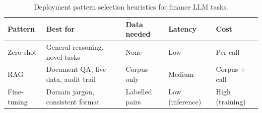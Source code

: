 \begin{table}[ht]
\centering
\caption{Deployment pattern selection heuristics for finance LLM tasks.}
\label{tab:deployment-heuristics}
\small
\begin{tabularx}{\linewidth}{l X X l X}
\hline
\textbf{Pattern} & \textbf{Best for} & \textbf{Data needed} & \textbf{Latency} & \textbf{Cost} \\
\hline
Zero-shot & General reasoning, novel tasks & None & Low & Per-call \\
RAG & Document QA, live data, audit trail & Corpus only & Medium & Corpus + call \\
Fine-tuning & Domain jargon, consistent format & Labelled pairs & Low (inference) & High (training) \\
\hline
\end{tabularx}
\end{table}

